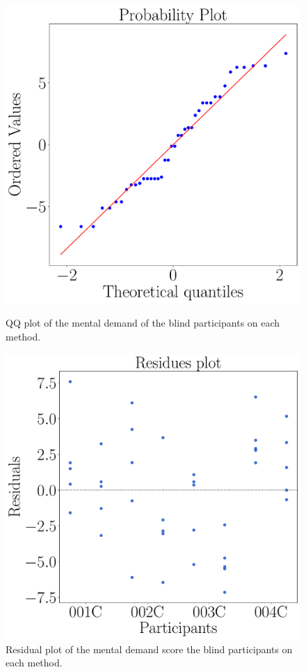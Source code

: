 \begin{figure}[!htb]
    \centering
    \begin{minipage}{0.45\textwidth}
        \centering
        \includegraphics[width = 0.8\linewidth]{Resultados/Nasa/Figuras/pdf/qqplot_md_avg_two_way_blind.pdf}
        \caption{QQ plot of the mental demand of the blind participants on each method.}
        \label{fig:qqplot_md_avg_two_way_blind}
    \end{minipage}
    \begin{minipage}{0.075\textwidth}
        \hfill
    \end{minipage}
    \begin{minipage}{0.45\textwidth}
        \centering
        \includegraphics[width = 0.8\linewidth]{Resultados/Nasa/Figuras/pdf/residplot_md_avg_two_way_blind.pdf}
        \caption{Residual plot of the mental demand score the blind participants on each method.}
        \label{fig:residplot_md_avg_two_way_blind}
    \end{minipage}
\end{figure}

